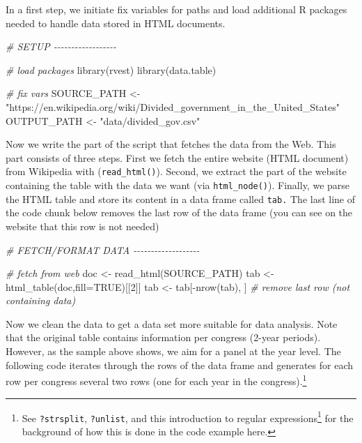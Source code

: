 \documentclass[
  12pt,
]{style/krantz}
\newenvironment{Shaded}{\begin{snugshade}}{\end{snugshade}}
\newcommand{\AttributeTok}[1]{\textcolor[rgb]{0.77,0.63,0.00}{#1}}
\newcommand{\CommentTok}[1]{\textcolor[rgb]{0.56,0.35,0.01}{\textit{#1}}}
\newcommand{\ConstantTok}[1]{\textcolor[rgb]{0.00,0.00,0.00}{#1}}
\newcommand{\DecValTok}[1]{\textcolor[rgb]{0.00,0.00,0.81}{#1}}
\newcommand{\FunctionTok}[1]{\textcolor[rgb]{0.00,0.00,0.00}{#1}}
\newcommand{\NormalTok}[1]{#1}
\newcommand{\OtherTok}[1]{\textcolor[rgb]{0.56,0.35,0.01}{#1}}
\newcommand{\SpecialCharTok}[1]{\textcolor[rgb]{0.00,0.00,0.00}{#1}}
\newcommand{\StringTok}[1]{\textcolor[rgb]{0.31,0.60,0.02}{#1}}
\renewcommand{\href}[2]{#2\footnote{\url{#1}}}
\begin{document}
In a first step, we initiate fix variables for paths and load additional R packages needed to handle data stored in HTML documents.

\begin{Shaded}
\begin{Highlighting}[]
\CommentTok{\# SETUP {-}{-}{-}{-}{-}{-}{-}{-}{-}{-}{-}{-}{-}{-}{-}{-}{-}{-}}

\CommentTok{\# load packages}
\FunctionTok{library}\NormalTok{(rvest)}
\FunctionTok{library}\NormalTok{(data.table)}

\CommentTok{\# fix vars}
\NormalTok{SOURCE\_PATH }\OtherTok{\textless{}{-}} \StringTok{"https://en.wikipedia.org/wiki/Divided\_government\_in\_the\_United\_States"}
\NormalTok{OUTPUT\_PATH }\OtherTok{\textless{}{-}} \StringTok{"data/divided\_gov.csv"}
\end{Highlighting}
\end{Shaded}

Now we write the part of the script that fetches the data from the Web. This part consists of three steps. First we fetch the entire website (HTML document) from Wikipedia with (\texttt{read\_html()}). Second, we extract the part of the website containing the table with the data we want (via \texttt{html\_node()}). Finally, we parse the HTML table and store its content in a data frame called \texttt{tab.} The last line of the code chunk below removes the last row of the data frame (you can see on the website that this row is not needed)

\begin{Shaded}
\begin{Highlighting}[]
\CommentTok{\# FETCH/FORMAT DATA {-}{-}{-}{-}{-}{-}{-}{-}{-}{-}{-}{-}{-}{-}{-}{-}{-}{-}{-}}

\CommentTok{\# fetch from web}
\NormalTok{doc }\OtherTok{\textless{}{-}} \FunctionTok{read\_html}\NormalTok{(SOURCE\_PATH)}
\NormalTok{tab }\OtherTok{\textless{}{-}} \FunctionTok{html\_table}\NormalTok{(doc,}\AttributeTok{fill=}\ConstantTok{TRUE}\NormalTok{)[[}\DecValTok{2}\NormalTok{]]}
\NormalTok{tab }\OtherTok{\textless{}{-}}\NormalTok{ tab[}\SpecialCharTok{{-}}\FunctionTok{nrow}\NormalTok{(tab), ] }\CommentTok{\# remove last row (not containing data)}
\end{Highlighting}
\end{Shaded}

Now we clean the data to get a data set more suitable for data analysis. Note that the original table contains information per congress (2-year periods). However, as the sample above shows, we aim for a panel at the year level. The following code iterates through the rows of the data frame and generates for each row per congress several two rows (one for each year in the congress).\footnote{See \texttt{?strsplit}, \texttt{?unlist}, and \href{https://www.oreilly.com/content/an-introduction-to-regular-expressions/}{this introduction to regular expressions} for the background of how this is done in the code example here.}
\end{document}
